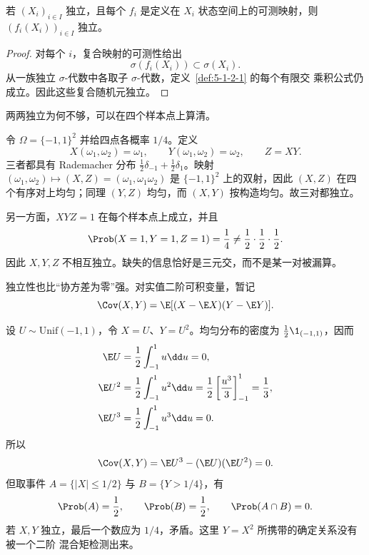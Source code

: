 \begin{proposition}[独立性的可测变换稳定性]\label{proposition:5-1-2-4}
若 $(X_i)_{i\in I}$ 独立，且每个 $f_i$ 是定义在 $X_i$ 状态空间上的可测映射，则
$(f_i(X_i))_{i\in I}$ 独立。
\end{proposition}

\begin{proof}
对每个 $i$，复合映射的可测性给出
\[
 \sigma(f_i(X_i))\subset\sigma(X_i).
\]
从一族独立 $\sigma$-代数中各取子 $\sigma$-代数，定义~\ref{def:5-1-2-1} 的每个有限交
乘积公式仍成立。因此这些复合随机元独立。
\end{proof}

两两独立为何不够，可以在四个样本点上算清。

\begin{example}[两两独立但不相互独立]\label{ex:5-1-2-2}
令 $\Omega=\{-1,1\}^2$ 并给四点各概率 $1/4$。定义
\[
 X(\omega_1,\omega_2)=\omega_1,
 \qquad Y(\omega_1,\omega_2)=\omega_2,
 \qquad Z=XY.
\]
三者都具有 Rademacher 分布
$\tfrac12\delta_{-1}+\tfrac12\delta_1$。映射
$(\omega_1,\omega_2)\mapsto(X,Z)=(\omega_1,\omega_1\omega_2)$ 是
$\{-1,1\}^2$ 上的双射，因此 $(X,Z)$ 在四个有序对上均匀；同理 $(Y,Z)$ 均匀，而
$(X,Y)$ 按构造均匀。故三对都独立。

另一方面，$XYZ=1$ 在每个样本点上成立，并且
\[
 \Prob(X=1,Y=1,Z=1)=\frac14
 \ne\frac12\cdot\frac12\cdot\frac12.
\]
因此 $X,Y,Z$ 不相互独立。缺失的信息恰好是三元交，而不是某一对被漏算。
\end{example}

独立性也比“协方差为零”强。对实值二阶可积变量，暂记
\[
 \Cov(X,Y)=\E[(X-\E X)(Y-\E Y)].
\]

\begin{example}[不相关不等于独立]\label{ex:5-1-2-3}
设 $U\sim\mathrm{Unif}(-1,1)$，令 $X=U$、$Y=U^2$。均匀分布的密度为
$\frac12\1_{(-1,1)}$，因而
\begin{align*}
 \E U&=\frac12\int_{-1}^{1}u\dd u=0,\\
 \E U^2&=\frac12\int_{-1}^{1}u^2\dd u
 =\frac12\left[\frac{u^3}{3}\right]_{-1}^{1}=\frac13,\\
 \E U^3&=\frac12\int_{-1}^{1}u^3\dd u=0.
\end{align*}
所以
\[
 \Cov(X,Y)=\E U^3-(\E U)(\E U^2)=0.
\]
但取事件 $A=\{|X|\le1/2\}$ 与 $B=\{Y>1/4\}$，有
\[
 \Prob(A)=\frac12,\qquad \Prob(B)=\frac12,\qquad \Prob(A\cap B)=0.
\]
若 $X,Y$ 独立，最后一个数应为 $1/4$，矛盾。这里 $Y=X^2$ 所携带的确定关系没有被一个二阶
混合矩检测出来。
\end{example}

